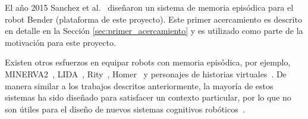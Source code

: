 El año 2015 Sanchez et al.~\cite{Sanchez:2015} diseñaron un sistema de memoria episódica para el robot Bender (plataforma de este proyecto). Este primer acercamiento es descrito en detalle en la Sección \ref{sec:primer_acercamiento} y es utilizado como parte de la motivación para este proyecto.


Existen otros esfuerzos en equipar robots con memoria episódica, por ejemplo, MINERVA2~\cite{Douglas1988}, LIDA~\cite{Feinstone2006}, Rity~\cite{Kuppuswamy2006}, Homer~\cite{Vere1990} y personajes de historias virtuales~\cite{Brom2007}. De manera similar a los trabajos descritos anteriormente, la mayoría de estos sistemas ha sido diseñado para satisfacer un contexto particular, por lo que no son útiles para el diseño de nuevos sistemas cognitivos robóticos~\cite{Stachowicz2012}.






